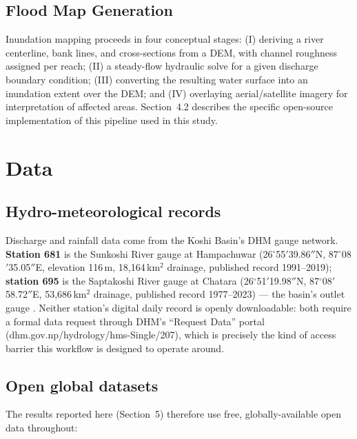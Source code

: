 \documentclass[11pt]{article}
\begin{document}
\subsection{Flood Map Generation}
Inundation mapping proceeds in four conceptual stages: (I) deriving a river centerline, bank lines, and cross-sections from a DEM, with channel roughness assigned per reach; (II) a steady-flow hydraulic solve for a given discharge boundary condition; (III) converting the resulting water surface into an inundation extent over the DEM; and (IV) overlaying aerial/satellite imagery for interpretation of affected areas. Section~4.2 describes the specific open-source implementation of this pipeline used in this study.

\section{Data}

\subsection{Hydro-meteorological records}
Discharge and rainfall data come from the Koshi Basin's DHM gauge network. \textbf{Station 681} is the Sunkoshi River gauge at Hampachuwar (26$^\circ$55$'$39.86$''$N, 87$^\circ$08$'$35.05$''$E, elevation 116\,m, 18,164\,km$^2$ drainage, published record 1991--2019); \textbf{station 695} is the Saptakoshi River gauge at Chatara (26$^\circ$51$'$19.98$''$N, 87$^\circ$08$'$58.72$''$E, 53,686\,km$^2$ drainage, published record 1977--2023) --- the basin's outlet gauge \citep{dhm2025stationlist}. Neither station's digital daily record is openly downloadable: both require a formal data request through DHM's ``Request Data'' portal (dhm.gov.np/hydrology/hms-Single/207), which is precisely the kind of access barrier this workflow is designed to operate around.

\subsection{Open global datasets}
The results reported here (Section~5) therefore use free, globally-available open data throughout:
\end{document}
